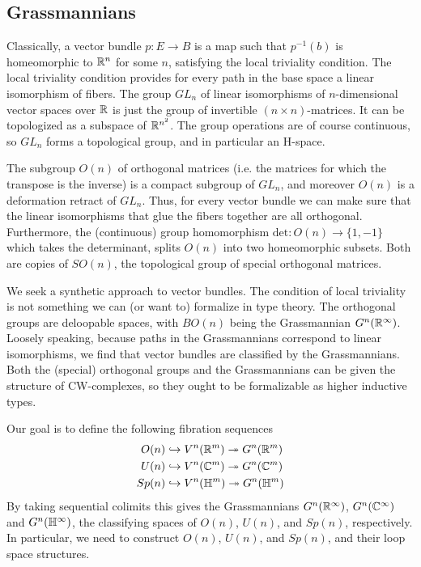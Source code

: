 \documentclass[reqno]{amsart}
\begin{document}
\subsection{Grassmannians}
Classically, a vector bundle $p:E\to B$ is a map such that $p^{-1}(b)$ is homeomorphic to $\mathbb{R}^n$ for some $n$, satisfying the local triviality condition. The local triviality condition provides for every path in the base space a linear isomorphism of fibers. The group $GL_n$ of linear isomorphisms of $n$-dimensional vector spaces over $\mathbb{R}$ is just the group of invertible $(n\times n)$-matrices. It can be topologized as a subspace of $\mathbb{R}^{n^2}$. The group operations are of course continuous, so $GL_n$ forms a topological group, and in particular an H-space.

The subgroup $O(n)$ of orthogonal matrices (i.e. the matrices for which the transpose is the inverse) is a compact subgroup of $GL_n$, and moreover $O(n)$ is a deformation retract of $GL_n$. Thus, for every vector bundle we can make sure that the linear isomorphisms that glue the fibers together are all orthogonal. Furthermore, the (continuous) group homomorphism $\mathrm{det}:O(n)\to \{1,-1\}$ which takes the determinant, splits $O(n)$ into two homeomorphic subsets. Both are copies of $SO(n)$, the topological group of special orthogonal matrices.  

We seek a synthetic approach to vector bundles. The condition of local triviality is not something we can (or want to) formalize in type theory. The orthogonal groups are deloopable spaces, with $BO(n)$ being the Grassmannian $G^n(\mathbb{R}^\infty)$. Loosely speaking, because paths in the Grassmannians correspond to linear isomorphisms, we find that vector bundles are classified by the Grassmannians. Both the (special) orthogonal groups and the Grassmannians can be given the structure of CW-complexes, so they ought to be formalizable as higher inductive types. 

Our goal is to define the following fibration sequences
\begin{align*}
O(n) & \hookrightarrow V^{n}(\mathbb{R}^m) \twoheadrightarrow G^{n}(\mathbb{R}^m) \\
U(n) & \hookrightarrow V^{n}(\mathbb{C}^m) \twoheadrightarrow G^{n}(\mathbb{C}^m) \\
Sp(n) & \hookrightarrow V^{n}(\mathbb{H}^m) \twoheadrightarrow G^{n}(\mathbb{H}^m)
\end{align*}
By taking sequential colimits this gives the Grassmannians $G^n(\mathbb{R}^\infty)$, $G^n(\mathbb{C}^\infty)$ and $G^n(\mathbb{H}^\infty)$, the classifying spaces of $O(n)$, $U(n)$, and $Sp(n)$, respectively. In particular, we need to construct $O(n)$, $U(n)$, and $Sp(n)$, and their loop space structures. 
\end{document}
